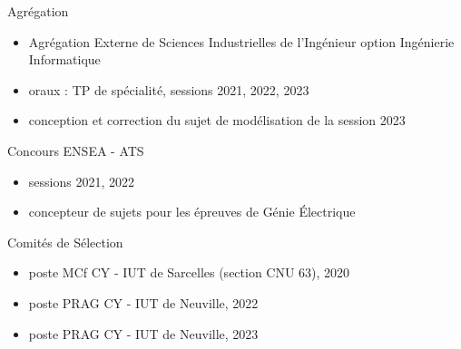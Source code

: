 \begin{cvskills}
  \cvskill
    {Agrégation} %
    {\begin{itemize}
    	\item Agrégation Externe de Sciences Industrielles de l'Ingénieur option Ingénierie Informatique
    	\item oraux : TP de spécialité, sessions 2021, 2022, 2023
    	\item conception et correction du sujet de modélisation de la session 2023
    \end{itemize}
    } %
 
  \cvskill
    {Concours ENSEA - ATS} %
    {\begin{itemize}
    	\item sessions 2021, 2022
    	\item concepteur de sujets pour les épreuves de Génie Électrique
    \end{itemize}
    }
      \cvskill
    {Comités de Sélection} %
    {\begin{itemize}
    	\item poste MCf CY - IUT de Sarcelles (section CNU 63), 2020
    	\item poste PRAG CY - IUT de Neuville, 2022
    	\item poste PRAG CY - IUT de Neuville, 2023
    \end{itemize}
    }
\end{cvskills}